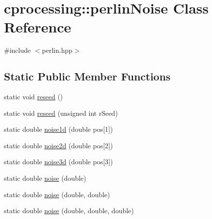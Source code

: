 \hypertarget{classcprocessing_1_1perlinNoise}{\section{cprocessing\-:\-:perlin\-Noise \-Class \-Reference}
\label{classcprocessing_1_1perlinNoise}
}


{\ttfamily \#include $<$perlin.\-hpp$>$}

\subsection*{\-Static \-Public \-Member \-Functions}
\begin{DoxyCompactItemize}
\item 
static void \hyperlink{classcprocessing_1_1perlinNoise_a882acdba45346139eb9560d911d87c50}{reseed} ()
\item 
static void \hyperlink{classcprocessing_1_1perlinNoise_ae1fa46303805bdada3b7f0985c24f59b}{reseed} (unsigned int r\-Seed)
\item 
static double \hyperlink{classcprocessing_1_1perlinNoise_a2723ae0635c5f9d0de66d9f6c02f43de}{noise1d} (double pos\mbox{[}1\mbox{]})
\item 
static double \hyperlink{classcprocessing_1_1perlinNoise_a1bd09b9c338bb394589dfe364765ce22}{noise2d} (double pos\mbox{[}2\mbox{]})
\item 
static double \hyperlink{classcprocessing_1_1perlinNoise_adb6a6c0904b7ae25451e193209a08d4f}{noise3d} (double pos\mbox{[}3\mbox{]})
\item 
static double \hyperlink{classcprocessing_1_1perlinNoise_a938a654df217929f8c05a5c151aac520}{noise} (double)
\item 
static double \hyperlink{classcprocessing_1_1perlinNoise_a28950d882c1226001b7278484e9380af}{noise} (double, double)
\item 
static double \hyperlink{classcprocessing_1_1perlinNoise_a4e5a2fc7ad57fa207ec9d01914e2ee7a}{noise} (double, double, double)
\end{DoxyCompactItemize}


